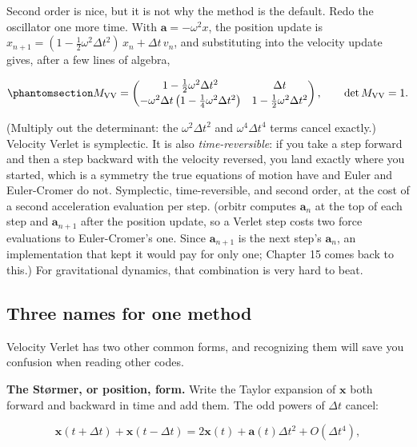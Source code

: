 \documentclass[
  10.5pt,
  letterpaper,
]{scrbook}
\theoremstyle{definition}
\theoremstyle{plain}
\theoremstyle{remark}
\begin{document}
Second order is nice, but it is not why the method is the default. Redo
the oscillator one more time. With \(\mathbf{a} = -\omega^2 x\), the
position update is
\(x_{n+1} = (1 - \tfrac12\omega^2\Delta t^2)\,x_n + \Delta t\, v_n\),
and substituting into the velocity update gives, after a few lines of
algebra,

\begin{equation}\protect\phantomsection\label{eq-vv-matrix}{
M_{\mathrm{VV}} = \begin{pmatrix}
1 - \tfrac12\omega^2\Delta t^2 & \Delta t \\[2pt]
-\omega^2\Delta t\left(1 - \tfrac14\omega^2\Delta t^2\right) & 1 - \tfrac12\omega^2\Delta t^2
\end{pmatrix},
\qquad \det M_{\mathrm{VV}} = 1.
}\end{equation}

(Multiply out the determinant: the \(\omega^2\Delta t^2\) and
\(\omega^4\Delta t^4\) terms cancel exactly.) Velocity Verlet is
symplectic. It is also \emph{time-reversible}: if you take a step
forward and then a step backward with the velocity reversed, you land
exactly where you started, which is a symmetry the true equations of
motion have and Euler and Euler-Cromer do not. Symplectic,
time-reversible, and second order, at the cost of a second acceleration
evaluation per step. (orbitr computes \(\mathbf{a}_n\) at the top of
each step and \(\mathbf{a}_{n+1}\) after the position update, so a
Verlet step costs two force evaluations to Euler-Cromer's one. Since
\(\mathbf{a}_{n+1}\) is the next step's \(\mathbf{a}_n\), an
implementation that kept it would pay for only one; Chapter 15 comes
back to this.) For gravitational dynamics, that combination is very hard
to beat.

\subsection{Three names for one
method}\label{three-names-for-one-method}

Velocity Verlet has two other common forms, and recognizing them will
save you confusion when reading other codes.

\textbf{The Størmer, or position, form.} Write the Taylor expansion of
\(\mathbf{x}\) both forward and backward in time and add them. The odd
powers of \(\Delta t\) cancel:

\[
\mathbf{x}(t+\Delta t) + \mathbf{x}(t-\Delta t) = 2\mathbf{x}(t) + \mathbf{a}(t)\Delta t^2 + O(\Delta t^4),
\]
\end{document}
